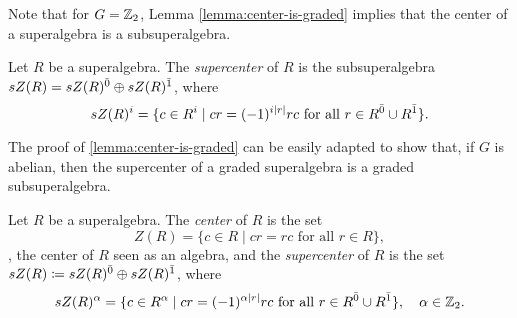 Note that for $G=\mathbb{Z}_2$, Lemma \ref{lemma:center-is-graded} implies that the center of a superalgebra is a subsuperalgebra. 


\begin{defi}\label{defi:supercenter}
	Let $R$ be a superalgebra.
	The \emph{supercenter} of $R$ is the subsuperalgebra $sZ(R) = sZ(R)^{\bar0} \oplus sZ(R)^{\bar1}$, where
	\[
		sZ(R)^i = \{c\in R^i \mid cr = (-1)^{i|r|} rc \text{ for all } r\in R^{\bar0} \cup R^{\bar1} \}.
	\]
\end{defi}

The proof of \cref{lemma:center-is-graded} can be easily adapted to show that, if $G$ is abelian, then the supercenter of a graded superalgebra is a graded subsuperalgebra. 


\begin{defi}
	Let $R$ be a superalgebra.
	The \emph{center} of $R$ is the set
	\[
		Z(R) = \{c\in R \mid cr = rc \text{ for all } r\in R \},
	\]
	\ie, the center of $R$ seen as an algebra, and the \emph{supercenter} of $R$ is the set $sZ(R) \coloneqq sZ(R)^{\bar0} \oplus sZ(R)^{\bar1}$, where
	\begin{align*}
		sZ(R)^\alpha = \{c\in R^\alpha \mid cr = (-1)^{\alpha |r|} rc \text{ for all } r\in R^{\bar0}\cup R^{\bar1} \},\quad \alpha \in \mathbb{Z}_2.
	\end{align*}
\end{defi}





